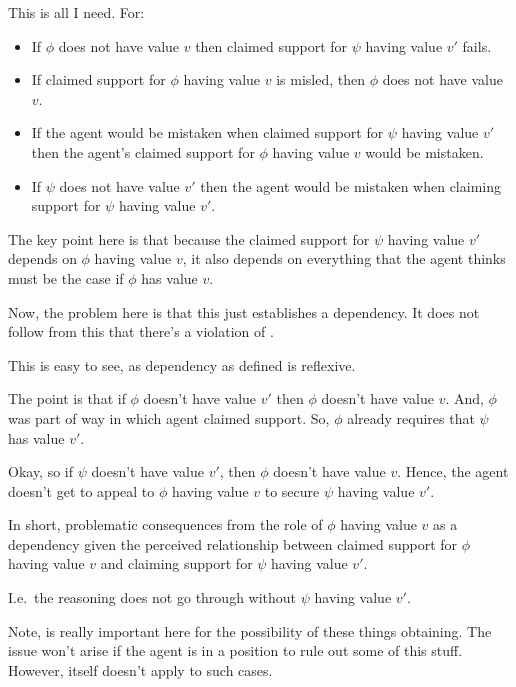 \begin{note}
  This is all I need.
  For:
  \begin{itemize}
  \item If \(\phi\) does not have value \(v\) then claimed support for \(\psi\) having value \(v'\) fails.
  \item If claimed support for \(\phi\) having value \(v\) is misled, then \(\phi\) does not have value \(v\).
  \item If the agent would be mistaken when claimed support for \(\psi\) having value \(v'\) then the agent's claimed support for \(\phi\) having value \(v\) would be mistaken.
  \item If \(\psi\) does not have value \(v'\) then the agent would be mistaken when claiming support for \(\psi\) having value \(v'\).
  \end{itemize}
  The key point here is that because the claimed support for \(\psi\) having value \(v'\) depends on \(\phi\) having value \(v\), it also depends on everything that the agent thinks must be the case if \(\phi\) has value \(v\).

  Now, the problem here is that this just establishes a dependency.
  It does not follow from this that there's a violation of \eiS{}.

  This is easy to see, as dependency as defined is reflexive.

  The point is that if \(\phi\) doesn't have value \(v'\) then \(\phi\) doesn't have value \(v\).
  And, \(\phi\) was part of way in which agent claimed support.
  So, \(\phi\) already requires that \(\psi\) has value \(v'\).

  Okay, so if \(\psi\) doesn't have value \(v'\), then \(\phi\) doesn't have value \(v\).
  Hence, the agent doesn't get to appeal to \(\phi\) having value \(v\) to secure \(\psi\) having value \(v'\).

  In short, problematic consequences from the role of \(\phi\) having value \(v\) as a dependency given the perceived relationship between claimed support for \(\phi\) having value \(v\) and claiming support for \(\psi\) having value \(v'\).

  I.e.\ the reasoning does not go through without \(\psi\) having value \(v'\).

  {
    \color{red}
    Note, \nfcs{} is really important here for the possibility of these things obtaining.
    The issue won't arise if the agent is in a position to rule out some of this stuff.
    However, \nI{} itself doesn't apply to such cases.
  }
\end{note}

